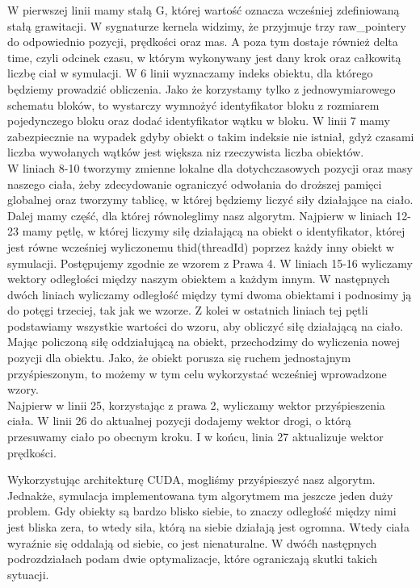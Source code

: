\documentclass[14pt,twoside,a4paper]{article}
\begin{document}
W pierwszej linii mamy stałą G, której wartość oznacza wcześniej zdefiniowaną stałą grawitacji.
W sygnaturze kernela widzimy, że przyjmuje trzy raw\_pointery do odpowiednio pozycji, prędkości oraz mas. A poza tym dostaje również delta time, czyli odcinek czasu, w którym wykonywany jest dany krok oraz całkowitą liczbę ciał w symulacji. W 6 linii wyznaczamy indeks obiektu, dla którego będziemy prowadzić obliczenia. Jako że korzystamy tylko z jednowymiarowego schematu bloków, to wystarczy wymnożyć identyfikator bloku z rozmiarem pojedynczego bloku oraz dodać identyfikator wątku w bloku. 
W linii 7 mamy zabezpiecznie na wypadek gdyby obiekt o takim indeksie nie istniał, gdyż czasami liczba wywołanych wątków jest większa niz rzeczywista liczba obiektów. \\
\bigskip
W liniach 8-10 tworzymy zmienne lokalne dla dotychczasowych pozycji oraz masy naszego ciała, żeby zdecydowanie ograniczyć odwołania do droższej pamięci globalnej oraz tworzymy tablicę, w której będziemy liczyć siły działające na ciało.\\
\bigskip
Dalej mamy część, dla której równoleglimy nasz algorytm. Najpierw w liniach 12-23 mamy pętlę, w której liczymy siłę działającą na obiekt o identyfikator, której jest równe wcześniej wyliczonemu thid(threadId) poprzez każdy inny obiekt w symulacji. Postępujemy zgodnie ze wzorem z Prawa 4. W liniach 15-16 wyliczamy wektory odległości między naszym obiektem a każdym innym. W następnych dwóch liniach wyliczamy odległość między tymi dwoma obiektami i podnosimy ją do potęgi trzeciej, tak jak we wzorze. Z kolei w ostatnich liniach tej pętli podstawiamy wszystkie wartości do wzoru, aby obliczyć siłę działającą na ciało. \\
\bigskip
Mając policzoną siłę oddziałującą na obiekt, przechodzimy do wyliczenia nowej pozycji dla obiektu. Jako, że obiekt porusza się ruchem jednostajnym przyśpieszonym, to możemy w tym celu wykorzystać wcześniej wprowadzone wzory.\\ Najpierw w linii 25, korzystając z prawa 2, wyliczamy wektor przyśpieszenia ciała. W linii 26 do aktualnej pozycji dodajemy wektor drogi, o którą przesuwamy ciało po obecnym kroku. I w końcu, linia 27 aktualizuje wektor prędkości.
\bigskip
\bigskip

Wykorzystując architekturę CUDA, mogliśmy przyśpieszyć nasz algorytm. Jednakże, symulacja implementowana tym algorytmem ma jeszcze jeden duży problem. Gdy obiekty są bardzo blisko siebie, to znaczy odległość między nimi jest bliska zera, to wtedy siła, którą na siebie działają jest ogromna. Wtedy ciała wyraźnie się oddalają od siebie, co jest nienaturalne.
W dwóćh następnych podrozdziałach podam dwie optymalizacje, które ograniczają skutki takich sytuacji.
\end{document}
